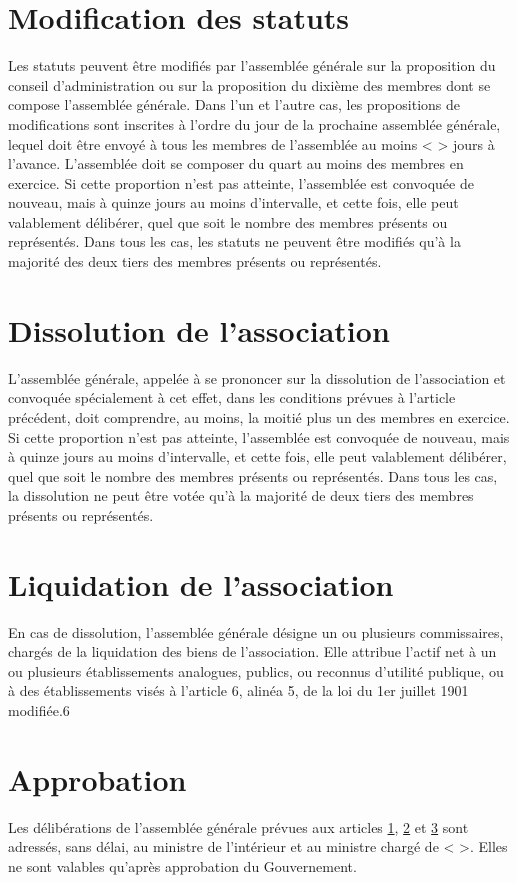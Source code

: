 \documentclass[a4paper,defaultorg]{organisation-contract}
\begin{document}
\section{Modification des statuts}
\label{modification}
Les statuts peuvent être modifiés par l'assemblée générale sur la proposition
du conseil d'administration ou sur la proposition du dixième des membres dont
se compose l'assemblée générale.  Dans l'un et l'autre cas, les propositions de
modifications sont inscrites à l'ordre du jour de la prochaine assemblée
générale, lequel doit être envoyé à tous les membres de l'assemblée au moins <
> jours à l'avance.  L'assemblée doit se composer du quart au moins des membres
en exercice. Si cette proportion n'est pas atteinte, l'assemblée est convoquée
de nouveau, mais à quinze jours au moins d'intervalle, et cette fois, elle peut
valablement délibérer, quel que soit le nombre des membres présents ou
représentés.  Dans tous les cas, les statuts ne peuvent être modifiés qu'à la
majorité des deux tiers des membres présents ou représentés.

\section{Dissolution de l'association}
\label{dissolution}
L'assemblée générale, appelée à se prononcer sur la dissolution de
l'association et convoquée spécialement à cet effet, dans les conditions
prévues à l'article précédent, doit comprendre, au moins, la moitié plus un des
membres en exercice.  Si cette proportion n'est pas atteinte, l'assemblée est
convoquée de nouveau, mais à quinze jours au moins d'intervalle, et cette fois,
elle peut valablement délibérer, quel que soit le nombre des membres présents
ou représentés.  Dans tous les cas, la dissolution ne peut être votée qu'à la
majorité de deux tiers des membres présents ou représentés.

\section{Liquidation de l'association}
\label{liquidation}
En cas de dissolution, l'assemblée générale désigne un ou plusieurs
commissaires, chargés de la liquidation des biens de l'association. Elle
attribue l'actif net à un ou plusieurs établissements analogues, publics, ou
reconnus d'utilité publique, ou à des établissements visés à l'article 6,
alinéa 5, de la loi du 1er juillet 1901 modifiée.6

\section{Approbation}
Les délibérations de l'assemblée générale prévues aux articles
\ref{modification}, \ref{dissolution} et \ref{liquidation} sont adressés, sans
délai, au ministre de l'intérieur et au ministre chargé de < >.  Elles ne sont
valables qu'après approbation du Gouvernement.
\end{document}
